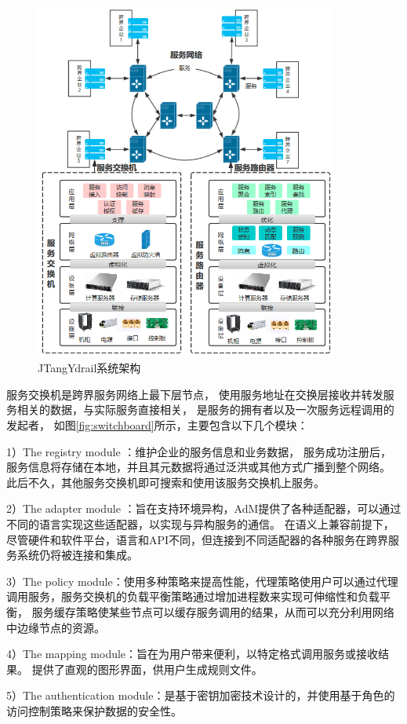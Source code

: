   \begin{figure}[htbp]
    \centering
    \includegraphics[width=10cm]{./images/system.png}
    \caption{JTangYdrail系统架构\cite{zhanghuan}}
    \label{fig:system}
  \end{figure}

  服务交换机是跨界服务网络上最下层节点，
  使用服务地址在交换层接收并转发服务相关的数据，与实际服务直接相关，
  是服务的拥有者以及一次服务远程调用的发起者，
如图\ref{fig:switchboard}所示，主要包含以下几个模块：

1）The registry module ：维护企业的服务信息和业务数据，
服务成功注册后，服务信息将存储在本地，并且其元数据将通过泛洪或其他方式广播到整个网络。
此后不久，其他服务交换机即可搜索和使用该服务交换机上服务。

2）The adapter module ：旨在支持环境异构，AdM提供了各种适配器，可以通过不同的语言实现这些适配器，以实现与异构服务的通信。
在语义上兼容前提下，尽管硬件和软件平台，语言和API不同，但连接到不同适配器的各种服务在跨界服务系统仍将被连接和集成。

3）The policy module：使用多种策略来提高性能，代理策略使用户可以通过代理调用服务，服务交换机的负载平衡策略通过增加进程数来实现可伸缩性和负载平衡，
服务缓存策略使某些节点可以缓存服务调用的结果，从而可以充分利用网络中边缘节点的资源。 

4）The mapping module：旨在为用户带来便利，以特定格式调用服务或接收结果。
 提供了直观的图形界面，供用户生成规则文件。 
 
5）The authentication module：是基于密钥加密技术设计的，并使用基于角色的访问控制策略来保护数据的安全性。

